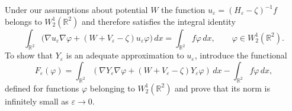 \documentclass[graybox]{svmult}
\newcommand{\Real}{\mathbb R}
\newcommand{\eps}{\varepsilon}
\renewcommand{\phi}{\varphi}
\begin{document}
Under our assumptions about potential $W$ the function $u_\eps=(H_\eps-\zeta)^{-1}f$ belongs to $W_2^1(\Real^2)$ and therefore satisfies the integral identity
\begin{equation}\label{IntegralIdentityUe}
  \int_{\Real^2}\big(\nabla u_\eps \nabla \phi+
              (W+V_\eps-\zeta)u_\eps \phi\big)\,dx= \int_{\Real^2}f\phi\,dx, \qquad \phi\in W_2^1(\Real^2).
\end{equation}
To show  that $Y_\eps$ is an adequate approximation to $u_\eps$, introduce  the functional
\begin{equation}\label{Feps}
F_\eps(\phi)=\int_{\Real^2}\left(\nabla Y_\eps \nabla \phi+
              (W+V_\eps-\zeta)Y_\eps \phi\right)\,dx
            -   \int_{\Real^2}f\phi\,dx,
\end{equation}
defined for functions $\phi$ belonging to $W_2^1(\Real^2)$ and prove that its norm is  infinitely small as $\eps\to 0$.
\end{document}
